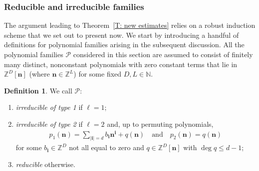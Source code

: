 \documentclass[11pt]{amsart}
\theoremstyle{definition}
\newtheorem{definition}[lemma]{Definition}
\newcommand{\N}{{\mathbb N}}
\newcommand{\Z}{{\mathbb Z}}
\newcommand{\CP}{{\mathcal P}}
\newcommand{\bn}{{\mathbf{n}}}
\newcommand{\1}{{\mathbf{1}}}
\newcommand{\bi}{{\textbf{i}}}
\begin{document}
\subsubsection{Reducible and irreducible families}
The argument leading to Theorem~\ref{T: new estimates} relies on a robust induction scheme that we set out to present now.  
We start by introducing a handful of definitions for polynomial families arising in the subsequent discussion. 
{All the polynomial families { $\CP$} considered in this section are assumed to consist of finitely many distinct, nonconstant polynomials with zero constant terms that lie in $\Z^D[\bn]$ (where $\bn\in\Z^L$) for some fixed $D, L\in\N$.}
\begin{definition}
    We call $\CP$:
    \begin{enumerate}
        \item \textit{irreducible of type 1} if $\ell =1$;
        \item \textit{irreducible of type 2} if $\ell = 2$ and, up to permuting polynomials, 
        \begin{align*}
         p_1(\bn) = \sum_{\vert\bi\vert=d} b_{\bi} \bn^\bi+q(\bn) \quad \textrm{and}\quad p_2(\bn) = q(\bn)   
        \end{align*}
        for some $b_{\bi}\in\Z^D$ not all equal to zero and $q\in\Z^{D}[\bn]$ with $\deg q\leq d-1$; 
        \item \textit{reducible} otherwise.
    \end{enumerate}
\end{definition}
\end{document}
